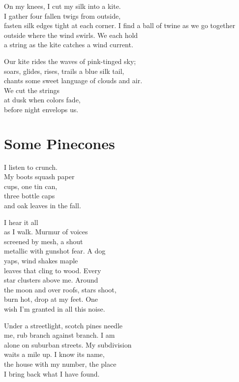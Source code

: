 \documentclass[twoside,10pt]{book}
\begin{document}
On my knees, I cut my silk into a kite.\\
I gather four fallen twigs from outside,\\
fasten silk edges tight at each corner. I find a ball of twine as we go
together\\
outside where the wind swirls. We each hold\\
a string as the kite catches a wind current.

Our kite rides the waves of pink-tinged sky;\\
soars, glides, rises, trails a blue silk tail,\\
chants some sweet language of clouds and air.\\
We cut the strings\\
at dusk when colors fade,\\
before night envelops us.


\clearpage
\section{Some Pinecones}

I listen to crunch.\\
My boots squash paper\\
cups, one tin can,\\
three bottle caps\\
and oak leaves in the fall.

I hear it all\\
as I walk. Murmur of voices\\
screened by mesh, a shout\\
metallic with gunshot fear. A dog\\
yaps, wind shakes maple\\
leaves that cling to wood. Every\\
star clusters above me. Around\\
the moon and over roofs, stars shoot,\\
burn hot, drop at my feet. One\\
wish I'm granted in all this noise.

Under a streetlight, scotch pines needle\\
me, rub branch against branch. I am\\
alone on suburban streets. My subdivision\\
waits a mile up. I know its name,\\
the house with my number, the place\\
I bring back what I have found.
\end{document}
